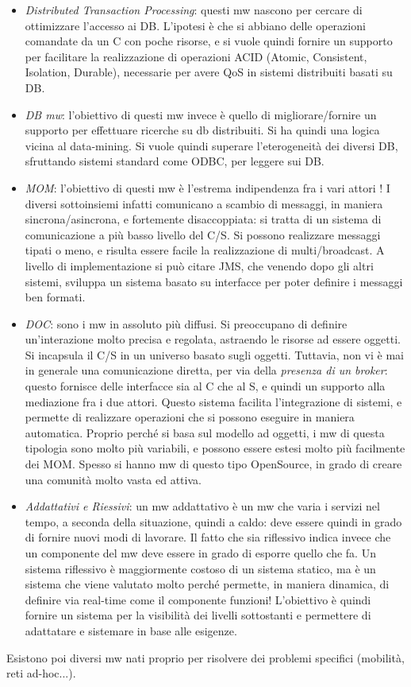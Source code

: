 \begin{itemize}
 \item \textit{Distributed Transaction Processing}: questi mw nascono per cercare di ottimizzare l'accesso ai DB.
 L'ipotesi è che si abbiano delle operazioni comandate da un C con poche risorse, e si vuole quindi fornire un supporto
 per facilitare la realizzazione di operazioni ACID (Atomic, Consistent, Isolation, Durable), necessarie per avere
 QoS in sistemi distribuiti basati su DB.
 \item \textit{DB mw}: l'obiettivo di questi mw invece è quello di migliorare/fornire un supporto per effettuare
 ricerche su db distribuiti. Si ha quindi una logica vicina al data-mining. Si vuole quindi superare l'eterogeneità
 dei diversi DB, sfruttando sistemi standard come ODBC, per leggere sui DB.
 \item \textit{MOM}: l'obiettivo di questi mw è l'estrema indipendenza fra i vari attori ! I diversi sottoinsiemi
 infatti comunicano a scambio di messaggi, in maniera sincrona/asincrona, e fortemente disaccoppiata: si tratta di un
 sistema di comunicazione a più basso livello del C/S. Si possono realizzare messaggi tipati o meno, e risulta essere
 facile la realizzazione di multi/broadcast.
 A livello di implementazione si può citare JMS, che venendo dopo gli altri sistemi, sviluppa un sistema basato su
 interfacce per poter definire i messaggi ben formati.
 \item \textit{DOC}: sono i mw in assoluto più diffusi. Si preoccupano di definire un'interazione molto precisa e
 regolata, astraendo le risorse ad essere oggetti.
 Si incapsula il C/S in un universo basato sugli oggetti. Tuttavia, non vi è mai in generale una comunicazione diretta,
 per via della \textit{presenza di un broker}: questo fornisce delle interfacce sia al C che al S, e quindi un supporto
 alla mediazione fra i due attori. Questo sistema facilita l'integrazione di sistemi, e permette di realizzare
 operazioni che si possono eseguire in maniera automatica.
 Proprio perché si basa sul modello ad oggetti, i mw di questa tipologia sono molto più variabili, e possono essere
 estesi molto più facilmente dei MOM. Spesso si hanno mw di questo tipo OpenSource, in grado di creare una comunità
 molto vasta ed attiva.
 \item \textit{Addattativi e Riessivi}: un mw addattativo è un mw che varia i servizi nel tempo, a seconda della
 situazione, quindi a caldo: deve essere quindi in grado di fornire nuovi modi di lavorare.
 Il fatto che sia riflessivo indica invece che un componente del mw deve essere in grado di esporre quello che fa. Un
 sistema riflessivo è maggiormente costoso di un sistema statico, ma è un sistema che viene valutato molto
 perché permette, in maniera dinamica, di definire via real-time come il componente funzioni!
 L'obiettivo è quindi fornire un sistema per la visibilità dei livelli sottostanti e permettere di adattatare e
 sistemare in base alle esigenze.
\end{itemize}
Esistono poi diversi mw nati proprio per risolvere dei problemi specifici (mobilità, reti ad-hoc...).
